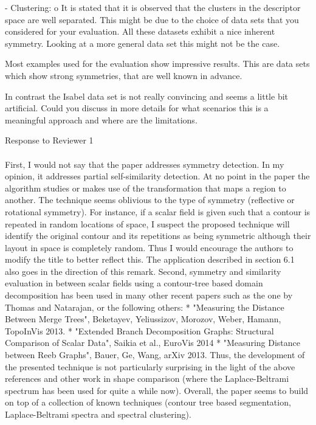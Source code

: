 \documentclass[10pt]{article}
\begin{document}
   - Clustering:
   o It is stated that it is observed that the clusters in the descriptor
   space are well separated. This might be due to the choice of data sets
   that you considered for your evaluation. All these datasets exhibit a
   nice inherent symmetry. Looking at a more general data set this might not
   be the case.
	
   Most examples used for the evaluation show impressive results. This are
   data sets which show strong symmetries, that are well known in advance.

   In contrast the Isabel data set is not really convincing and seems a
   little bit artificial. Could you discuss in more details for what
   scenarios this is a meaningful approach and where are the limitations.

{\noindent \LARGE Response to Reviewer 1}\\\\
   First, I would not say that the paper addresses symmetry detection. In my
   opinion, it addresses partial self-similarity detection. At no point in
   the paper the algorithm studies or makes use of the transformation that
   maps a region to another. The technique seems oblivious to the type of
   symmetry (reflective or rotational symmetry). For instance, if a scalar
   field is given such that a contour is repeated in random locations of
   space, I suspect the proposed technique will identify the original
   contour and its repetitions as being symmetric although their layout in
   space is completely random. Thus I would encourage the authors to modify
   the title to better reflect this. The application described in section
   6.1 also goes in the direction of this remark.
   Second, symmetry and similarity evaluation in between scalar fields using
   a contour-tree based domain decomposition has been used in many other
   recent papers such as the one by Thomas and Natarajan, or the following
   others:
   * "Measuring the Distance Between Merge Trees", Beketayev, Yeliussizov, 
   Morozov, Weber, Hamann, TopoInVis 2013.
   * "Extended Branch Decomposition Graphs: Structural Comparison of Scalar
   Data", Saikia et al., EuroVis 2014
   * "Measuring Distance between Reeb Graphs", Bauer, Ge, Wang, arXiv 2013.
   Thus, the development of the presented technique is not particularly
   surprising in the light of the above references and other work in shape
   comparison (where the Laplace-Beltrami spectrum has been used for quite a
   while now). Overall, the paper seems to build on top of a collection of
   known techniques (contour tree based segmentation, Laplace-Beltrami
   spectra and spectral clustering).
\end{document}
